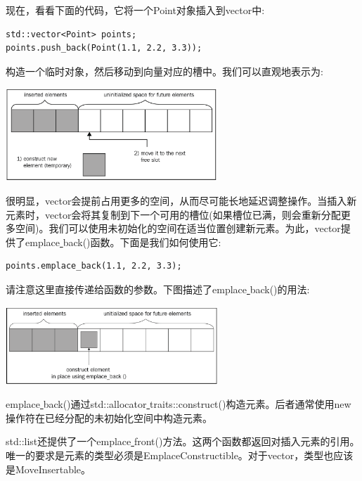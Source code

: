 现在，看看下面的代码，它将一个Point对象插入到vector中: \par

\begin{lstlisting}[caption={}]
std::vector<Point> points;
points.push_back(Point(1.1, 2.2, 3.3));
\end{lstlisting}

构造一个临时对象，然后移动到向量对应的槽中。我们可以直观地表示为: \par

\begin{center}
	\includegraphics[width=0.6\textwidth]{content/Section-2/Chapter-6/15}
\end{center}

很明显，vector会提前占用更多的空间，从而尽可能长地延迟调整操作。当插入新元素时，vector会将其复制到下一个可用的槽位(如果槽位已满，则会重新分配更多空间)。我们可以使用未初始化的空间在适当位置创建新元素。为此，vector提供了emplace\underline{ }back()函数。下面是我们如何使用它: \par

\begin{lstlisting}[caption={}]
points.emplace_back(1.1, 2.2, 3.3);
\end{lstlisting}

请注意这里直接传递给函数的参数。下图描述了emplace\underline{ }back()的用法: \par

\begin{center}
	\includegraphics[width=0.6\textwidth]{content/Section-2/Chapter-6/16}
\end{center}

emplace\underline{ }back()通过std::allocator\underline{ }traits::construct()构造元素。后者通常使用new操作符在已经分配的未初始化空间中构造元素。 \par
std::list还提供了一个emplace\underline{ }front()方法。这两个函数都返回对插入元素的引用。唯一的要求是元素的类型必须是EmplaceConstructible。对于vector，类型也应该是MoveInsertable。 \par

